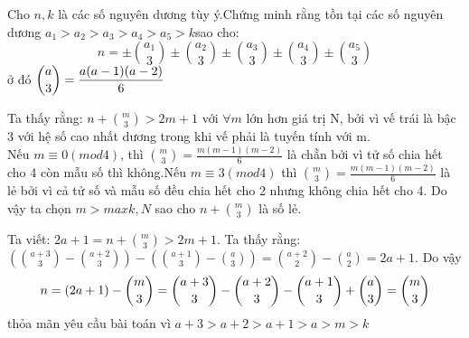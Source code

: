 \begin{baitap}
Cho $n,k$ là các số nguyên dương tùy ý.Chứng minh rằng tồn tại các số nguyên dương $a_1>a_2>a_3>a_4>a_5>k$sao cho:\\
$$n=\pm\binom{a_1}{3}\pm\binom{a_2}{3}\pm\binom{a_3}{3}\pm\binom{a_4}{3}\pm\binom{a_5}{3}$$
ở đó $\dbinom{a}{3}=\dfrac{a(a-1)(a-2)}{6}$

\begin{loigiai4}
Ta thấy rằng: $n+\binom{m}{3}>2m+1$ với $\forall m$ lớn hơn giá trị N, bởi vì vế trái là bậc 3 với hệ số cao nhất dương trong khi vế phải là tuyến tính với m.\\

Nếu $m\equiv 0(mod4)$, thì $ \binom{m}{3}=\frac{m(m-1)(m-2)}{6}$ là chẵn bởi vì tử số chia hết cho 4 còn mẫu số thì không.Nếu $m\equiv 3(mod4)$ thì $ \binom{m}{3}=\frac{m(m-1)(m-2)}{6}$ là lẻ bởi vì cả tử số và mẫu số đều chia hết cho 2 nhưng không chia hết cho 4. Do vậy ta chọn $m>max{k,N}$ sao cho $n+\binom{m}{3}$ là số lẻ.

Ta viết: $2a+1=n+\binom{m}{3}>2m+1$. Ta thấy rằng:$(\binom{a+3}{3}-\binom{a+2}{3})-(\binom{a+1}{3}-\binom{a}{3})=\binom{a+2}{2}-\binom{a}{2}=2a+1$. Do vậy
$$n=(2a+1)-\dbinom{m}{3}=\dbinom{a+3}{3}-\dbinom{a+2}{3}-\dbinom{a+1}{3}+\dbinom{a}{3}=\dbinom{m}{3}$$
thỏa mãn yêu cầu bài toán vì $a+3>a+2>a+1>a>m>k$
\end{loigiai4}
\end{baitap}

